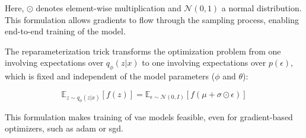 Here, $\odot$ denotes element-wise multiplication and $\mathcal{N}(0,1)$ a normal distribution. This formulation allows gradients to flow through the sampling process, enabling end-to-end training of the model.

The reparameterization trick transforms the optimization problem from one involving expectations over $q_\phi(z|x)$ to one involving expectations over $p(\epsilon)$, which is fixed and independent of the model parameters ($\phi$ and $\theta$):

\begin{equation}
    \mathbb{E}_{z \sim q_\phi(z|x)}[f(z)] = \mathbb{E}_{\epsilon \sim \mathcal{N}(0,I)}[f(\mu + \sigma \odot \epsilon)]
\end{equation}

This formulation makes training of \acrshort{vae} models feasible, even for gradient-based optimizers, such as \acrshort{adam} or \acrshort{sgd}.


